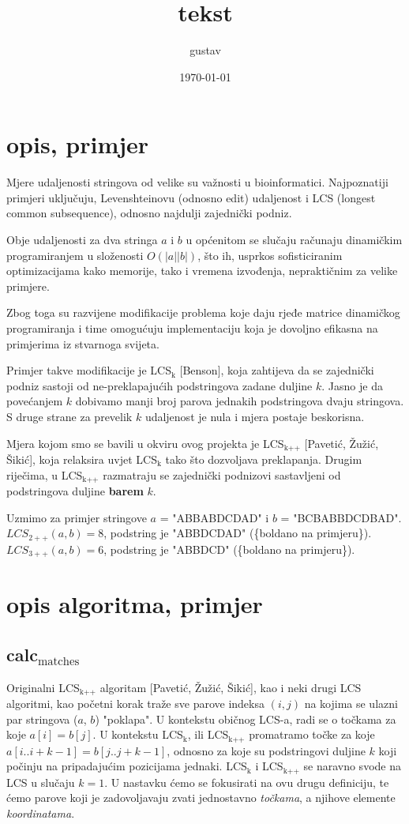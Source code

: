 \documentclass[11pt]{article}
\author{gustav}
\date{\today}
\title{tekst}
\begin{document}
\maketitle
\tableofcontents

\section{opis, primjer}
\label{sec-1}
Mjere udaljenosti stringova od velike su važnosti u bioinformatici.
Najpoznatiji primjeri uključuju, Levenshteinovu (odnosno edit)
udaljenost i LCS (longest common subsequence), odnosno najdulji
zajednički podniz.

Obje udaljenosti za dva stringa $a$ i $b$ u općenitom se slučaju
računaju dinamičkim programiranjem u složenosti $O(|a||b|)$, što ih,
usprkos sofisticiranim optimizacijama kako memorije, tako i vremena
izvođenja, nepraktičnim za velike primjere.

Zbog toga su razvijene modifikacije problema koje daju rjeđe matrice
dinamičkog programiranja i time omogućuju implementaciju koja je 
dovoljno efikasna na primjerima iz stvarnoga svijeta.

Primjer takve modifikacije je LCS$_{\text{k}}$ [Benson], koja zahtijeva da
se zajednički podniz sastoji od ne-preklapajućih podstringova
zadane duljine $k$. Jasno je da povećanjem $k$ dobivamo manji
broj parova jednakih podstringova dvaju stringova. S druge strane
za prevelik $k$ udaljenost je nula i mjera postaje beskorisna.

Mjera kojom smo se bavili u okviru ovog projekta je LCS$_{\text{k++}}$ [Pavetić,
Žužić, Šikić], koja relaksira uvjet LCS$_{\text{k}}$ tako što dozvoljava
preklapanja. Drugim riječima, u LCS$_{\text{k++}}$ razmatraju se zajednički
podnizovi sastavljeni od podstringova duljine \textbf{barem} $k$.

Uzmimo za primjer stringove $a$ = "ABBABDCDAD" i $b$ = "BCBABBDCDBAD".
$LCS_{2++}(a,b) = 8$, podstring je "ABBDCDAD" (\{boldano na primjeru\}).
$LCS_{3++}(a,b) = 6$, podstring je "ABBDCD" (\{boldano na primjeru\}).

\section{opis algoritma, primjer}
\label{sec-2}
\subsection{calc$_{\text{matches}}$}
\label{sec-2-1}
Originalni LCS$_{\text{k++}}$ algoritam [Pavetić, Žužić, Šikić], kao i neki
drugi LCS algoritmi, kao početni korak traže sve parove indeksa $(i,
   j)$ na kojima se ulazni par stringova ($a$, $b$) "poklapa". U
kontekstu običnog LCS-a, radi se o točkama za koje $a[i] = b[j]$.  U
kontekstu LCS$_{\text{k}}$, ili LCS$_{\text{k++}}$ promatramo točke za koje
$a[i..i+k-1] = b[j..j+k-1]$, odnosno za koje su podstringovi
duljine $k$ koji počinju na pripadajućim pozicijama jednaki. LCS$_{\text{k}}$
i LCS$_{\text{k++}}$ se naravno svode na LCS u slučaju $k = 1$. U nastavku
ćemo se fokusirati na ovu drugu definiciju, te ćemo parove koji je
zadovoljavaju zvati jednostavno \emph{točkama}, a njihove elemente
\emph{koordinatama}.
\end{document}
